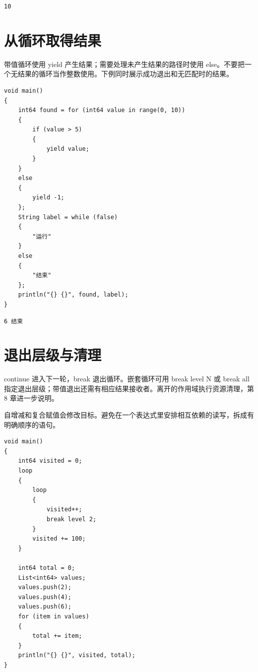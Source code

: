 \par
\medskip
\begin{lstlisting}[style=out]
10
\end{lstlisting}
\par
\medskip

\section{从循环取得结果}

带值循环使用 yield 产生结果；需要处理未产生结果的路径时使用 else。不要把一个无结果的循环当作整数使用。下例同时展示成功退出和无匹配时的结果。

\par
\medskip
\begin{lstlisting}[style=chali]
void main()
{
    int64 found = for (int64 value in range(0, 10))
    {
        if (value > 5)
        {
            yield value;
        }
    }
    else
    {
        yield -1;
    };
    String label = while (false)
    {
        "运行"
    }
    else
    {
        "结束"
    };
    println("{} {}", found, label);
}
\end{lstlisting}
\par
\medskip

\par
\medskip
\begin{lstlisting}[style=out]
6 结束
\end{lstlisting}
\par
\medskip

\section{退出层级与清理}

continue 进入下一轮，break 退出循环。嵌套循环可用 break level N 或 break all 指定退出层级；带值退出还需有相应结果接收者。离开的作用域执行资源清理，第 8 章进一步说明。

自增减和复合赋值会修改目标。避免在一个表达式里安排相互依赖的读写，拆成有明确顺序的语句。

\par
\medskip
\begin{lstlisting}[style=chali]
void main()
{
    int64 visited = 0;
    loop
    {
        loop
        {
            visited++;
            break level 2;
        }
        visited += 100;
    }

    int64 total = 0;
    List<int64> values;
    values.push(2);
    values.push(4);
    values.push(6);
    for (item in values)
    {
        total += item;
    }
    println("{} {}", visited, total);
}
\end{lstlisting}
\par
\medskip

